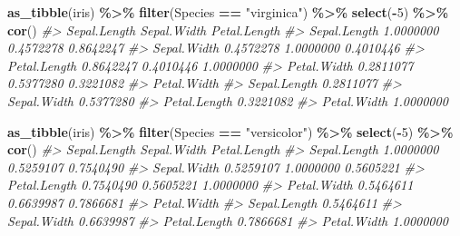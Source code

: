 \documentclass[
  xelatex, ja=standard]{bxjsbook}
\newenvironment{Shaded}{\begin{snugshade}}{\end{snugshade}}
\newcommand{\CommentTok}[1]{\textcolor[rgb]{0.56,0.35,0.01}{\textit{#1}}}
\newcommand{\DecValTok}[1]{\textcolor[rgb]{0.00,0.00,0.81}{#1}}
\newcommand{\FunctionTok}[1]{\textcolor[rgb]{0.13,0.29,0.53}{\textbf{#1}}}
\newcommand{\NormalTok}[1]{#1}
\newcommand{\SpecialCharTok}[1]{\textcolor[rgb]{0.81,0.36,0.00}{\textbf{#1}}}
\newcommand{\StringTok}[1]{\textcolor[rgb]{0.31,0.60,0.02}{#1}}
\theoremstyle{definition}
\theoremstyle{definition}
\theoremstyle{definition}
\theoremstyle{definition}
\theoremstyle{remark}
\begin{document}
\begin{Shaded}
\begin{Highlighting}[]
\FunctionTok{as\_tibble}\NormalTok{(iris) }\SpecialCharTok{\%\textgreater{}\%} \FunctionTok{filter}\NormalTok{(Species }\SpecialCharTok{==} \StringTok{"virginica"}\NormalTok{) }\SpecialCharTok{\%\textgreater{}\%} \FunctionTok{select}\NormalTok{(}\SpecialCharTok{{-}}\DecValTok{5}\NormalTok{) }\SpecialCharTok{\%\textgreater{}\%} \FunctionTok{cor}\NormalTok{()}
\CommentTok{\#\textgreater{}              Sepal.Length Sepal.Width Petal.Length}
\CommentTok{\#\textgreater{} Sepal.Length    1.0000000   0.4572278    0.8642247}
\CommentTok{\#\textgreater{} Sepal.Width     0.4572278   1.0000000    0.4010446}
\CommentTok{\#\textgreater{} Petal.Length    0.8642247   0.4010446    1.0000000}
\CommentTok{\#\textgreater{} Petal.Width     0.2811077   0.5377280    0.3221082}
\CommentTok{\#\textgreater{}              Petal.Width}
\CommentTok{\#\textgreater{} Sepal.Length   0.2811077}
\CommentTok{\#\textgreater{} Sepal.Width    0.5377280}
\CommentTok{\#\textgreater{} Petal.Length   0.3221082}
\CommentTok{\#\textgreater{} Petal.Width    1.0000000}
\end{Highlighting}
\end{Shaded}

\begin{Shaded}
\begin{Highlighting}[]
\FunctionTok{as\_tibble}\NormalTok{(iris) }\SpecialCharTok{\%\textgreater{}\%} \FunctionTok{filter}\NormalTok{(Species }\SpecialCharTok{==} \StringTok{"versicolor"}\NormalTok{) }\SpecialCharTok{\%\textgreater{}\%} \FunctionTok{select}\NormalTok{(}\SpecialCharTok{{-}}\DecValTok{5}\NormalTok{) }\SpecialCharTok{\%\textgreater{}\%} \FunctionTok{cor}\NormalTok{()}
\CommentTok{\#\textgreater{}              Sepal.Length Sepal.Width Petal.Length}
\CommentTok{\#\textgreater{} Sepal.Length    1.0000000   0.5259107    0.7540490}
\CommentTok{\#\textgreater{} Sepal.Width     0.5259107   1.0000000    0.5605221}
\CommentTok{\#\textgreater{} Petal.Length    0.7540490   0.5605221    1.0000000}
\CommentTok{\#\textgreater{} Petal.Width     0.5464611   0.6639987    0.7866681}
\CommentTok{\#\textgreater{}              Petal.Width}
\CommentTok{\#\textgreater{} Sepal.Length   0.5464611}
\CommentTok{\#\textgreater{} Sepal.Width    0.6639987}
\CommentTok{\#\textgreater{} Petal.Length   0.7866681}
\CommentTok{\#\textgreater{} Petal.Width    1.0000000}
\end{Highlighting}
\end{Shaded}
\end{document}
